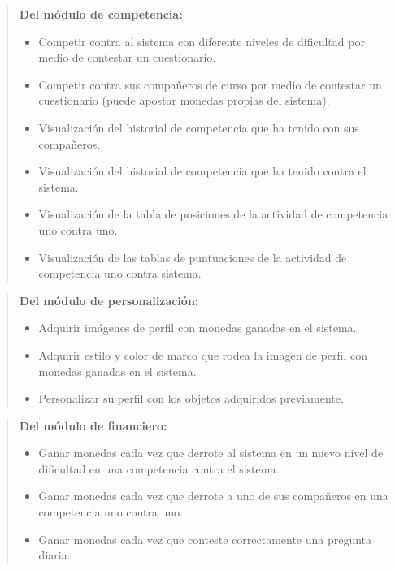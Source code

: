     \begin{quote}
    {\bf Del módulo de competencia:}
        \begin{itemize}
        \item Competir contra al sistema con diferente niveles de dificultad por medio de contestar un cuestionario.
        \item Competir contra sus compañeros de curso por medio de contestar un cuestionario (puede apostar monedas propias del sistema).
        \item Visualización del historial de competencia que ha tenido con sus compañeros.
        \item Visualización del historial de competencia que ha tenido contra el sistema.
        \item Visualización de la tabla de posiciones de la actividad de competencia uno contra uno.
        \item Visualización de las tablas de puntuaciones de la actividad de competencia uno contra sistema.
        \end{itemize}
    \end{quote}

    \begin{quote}
    {\bf Del módulo de personalización:}
        \begin{itemize}
        \item Adquirir imágenes de perfil con monedas ganadas en el sistema.
        \item Adquirir estilo y color de marco que rodea la imagen de perfil con monedas ganadas en el sistema.
        \item Personalizar su perfil con los objetos adquiridos previamente.
        \end{itemize}
    \end{quote}

    \begin{quote}
    {\bf Del módulo de financiero:}
        \begin{itemize}
        \item Ganar monedas cada vez que derrote al sistema en un nuevo nivel de dificultad en una competencia contra el sistema.
        \item Ganar monedas cada vez que derrote a uno de sus compañeros en una competencia uno contra uno.
        \item Ganar monedas cada vez que conteste correctamente una pregunta diaria.
        \end{itemize}
    \end{quote}


